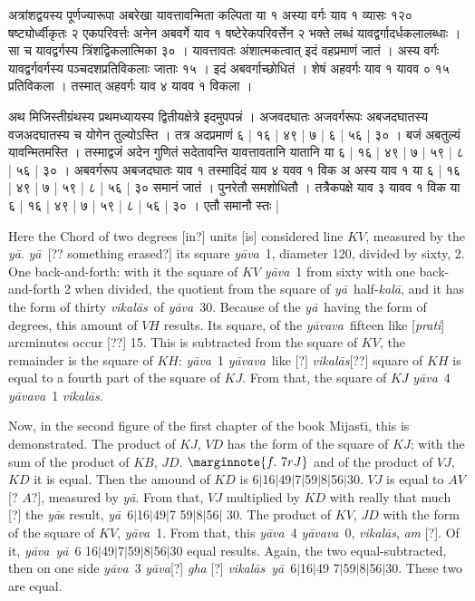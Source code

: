 \documentclass[11pt,a5paper]{book}
\def\kala{\textit{ka\-l\=a}}
\def\ya{\textit{y\=a}}
\def\yava{\textit{y\=ava}}
\def\yavava{\textit{y\=avava}}
\def\vikalas{\textit{vi\-ka\-l\=as}}
\def\danda{$|$}
\begin{document}
\newpage
{\s अत्रांशद्वयस्य पूर्णज्यारूपा अबरेखा
यावत्तावन्मिता कल्पिता या १ अस्या वर्गः 
याव १ व्यासः १२० षष्ट्योर्ध्वीकृतः २ एकपरिवर्त्तः अनेन अबवर्गे याव १ षष्टेरेकपरिवर्त्तेन २ भक्ते लब्धं
यावद्वर्गादर्धकलालब्धाः । सा च यावद्वर्गस्य त्रिंशद्विकलात्मिका ३० ।
यावत्तावतः अंशात्मकत्वात् इदं वहप्रमाणं जातं । अस्य वर्गः यावद्वर्गवर्गस्य 
पञ्चदशप्रतिविकलाः जाताः १५ । इदं अबवर्गाच्छोधितं । 
शेषं अहवर्गः याव १ यावव ० १५ प्रतिविकला । तस्मात् अहवर्गः याव ४ यावव ${\dot{१}}$ विकला । 

अथ मिजिस्तीग्रंथस्य प्रथमध्यायस्य द्वितीयक्षेत्रे इदमुपपन्नं । अजवदघातः अजवर्गरूपः
अबजदघातस्य वजअदघातस्य च योगेन तुल्योऽस्ति । तत्र अदप्रमाणं ६ | १६ | ४९ | ७ | ६ | ५६ | ३० । 
बजं अबतुल्यं
यावन्मितमस्ति । तस्माद्वजं अदेन गुणितं सदेतावन्ति यावत्तावतानि यातानि या ६ | १६ | ४९ | ७ | ५९ | ८ | ५६ | ३० । 
अबवर्गरूप अबजदघातः याव १
तस्मादिदं याव ४ यवव १ विक अ अस्य याव १ या ६ | १६ | ४९ | ७ | ५९ | ८ | ५६ | ३० समानं जातं । 
पुनरेतौ समशोधितौ । तत्रैकपक्षे
याव ३ यावव १ विक या ६ | १६ | ४९ | ७ | ५९ | ८ | ५६ | ३० । एतौ समानौ स्तः |}
\newpage
Here the Chord of two degrees [in?] units [is] considered line $KV$, measured by the \ya. 
\ya\ [?? something erased?] its square \yava\ 1, diameter 120, divided by sixty, 2. 
One back-and-forth: with it the square of $KV$ \yava\ 1 from sixty with one back-and-forth 2
when divided, the quotient from the square of \ya\ half-\kala, and it has the form of thirty \vikalas\
of \yava\ 30. Because of the \ya\ having the form of degrees, this amount of 
$VH$ results. Its square,  of the \yavava\ fifteen like [\textit{prati}] arcminutes occur [??] 15. 
This is subtracted from the square of $KV$, the remainder is the square of $KH$: 
\yava\ 1 \yavava\ like [?] \vikalas [??] square of $KH$ is equal to a fourth part of the
square of $KJ$. From that, the square of $KJ$ \yava\ 4 \yavava\ 1 \vikalas.

Now, in the second figure of the first chapter of the book Mijast\={\i}, this is demonstrated.
The product of $KJ$, $VD$ has the form of the square of $KJ$; with
the sum of the product of $KB$, $JD$. 
$\marginnote{f.~7r J}$
and of the product of $VJ$, $KD$ it is equal.  Then the amound of $KD$ is 
6\danda 16\danda 49\danda 7\danda 59\danda 8\danda 56\danda 30.  $VJ$ is equal to 
$AV$ [? $A$?], measured by \ya.  From that, $VJ$ multiplied by $KD$ with really
that much [?] the \ya s result, \ya\ 6\danda 16\danda 49\danda 7 59\danda 8\danda 56\danda
30. 
The product of $KV$, $JD$ with the form of
the square of $KV$, \yava\ 1. From that, this \yava\ 4 \yavava\ 0, \vikalas, 
\textit{a\*m} [?]. Of it, \yava\ \ya\ 6 16\danda 49\danda 7\danda 59\danda 8\danda 56\danda 30
equal results. Again, the two equal-subtracted, then on one side \yava\ 3 \yava  [?] \textit{gha} [?]
\vikalas\ \ya\ 6\danda 16\danda 49 7\danda 59\danda 8\danda 56\danda 30. These two are equal.
\end{document}
